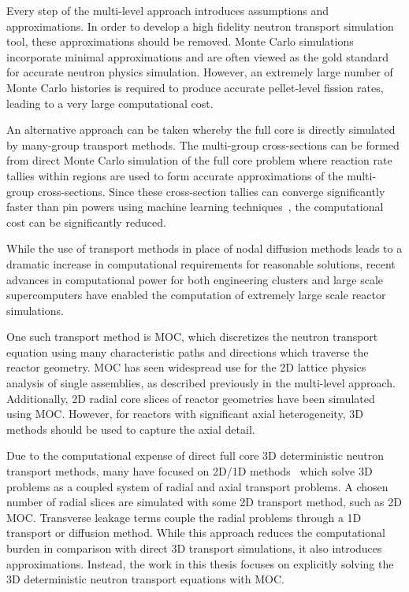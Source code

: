 Every step of the multi-level approach introduces assumptions and approximations. In order to develop a high fidelity neutron transport simulation tool, these approximations should be removed. Monte Carlo simulations incorporate minimal approximations and are often viewed as the gold standard for accurate neutron physics simulation. However, an extremely large number of Monte Carlo histories is required to produce accurate pellet-level fission rates, leading to a very large computational cost.

An alternative approach can be taken whereby the full core is directly simulated by many-group transport methods. The multi-group cross-sections can be formed from direct Monte Carlo simulation of the full core problem where reaction rate tallies within regions are used to form accurate approximations of the multi-group cross-sections. Since these cross-section tallies can converge significantly faster than pin powers using machine learning techniques~\cite{boyd2017thesis}, the computational cost can be significantly reduced. 

While the use of transport methods in place of nodal diffusion methods leads to a dramatic increase in computational requirements for reasonable solutions, recent advances in computational power for both engineering clusters and large scale supercomputers have enabled the computation of extremely large scale reactor simulations. 

One such transport method is \ac{MOC}, which discretizes the neutron transport equation using many characteristic paths and directions which traverse the reactor geometry. \ac{MOC} has seen widespread use for the 2D lattice physics analysis of single assemblies, as described previously in the multi-level approach. Additionally, 2D radial core slices of reactor geometries have been simulated using \ac{MOC}. However, for reactors with significant axial heterogeneity, 3D methods should be used to capture the axial detail. 

Due to the computational expense of direct full core 3D deterministic neutron transport methods, many have focused on 2D/1D methods~\cite{2d1d,liu2d1d, tang2d1d, collins2d1d, jarrett2d1d, wenbin2d1d} which solve 3D problems as a coupled system of radial and axial transport problems. A chosen number of radial slices are simulated with some 2D transport method, such as 2D \ac{MOC}. Transverse leakage terms couple the radial problems through a 1D transport or diffusion method. While this approach reduces the computational burden in comparison with direct 3D transport simulations, it also introduces approximations. Instead, the work in this thesis focuses on explicitly solving the 3D deterministic neutron transport equations with \ac{MOC}.

